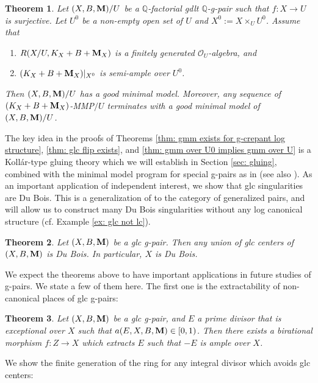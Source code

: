 \documentclass[11pt]{amsart}
\numberwithin{equation}{section}
\newcommand{\Mm}{{\bf{M}}}
\newcommand{\Qq}{\mathbb{Q}}
\newcommand{\Oo}{\mathcal{O}}
\newtheorem{thm}{Theorem}[section]
\theoremstyle{definition}
\theoremstyle{definition}
\theoremstyle{definition}
\begin{document}
\begin{thm}\label{thm: finite generation imply semi-ample}
  Let $(X,B,\Mm)/U$ be a $\Qq$-factorial gdlt $\Qq$-g-pair such that
  $f: X\to U$ is surjective. Let $U^0$ be a non-empty open set of $U$
  and $X^0:=X\times_U U^0$. Assume that
  \begin{enumerate}
    \item $R(X/U,K_X+B+\Mm_X)$ is a finitely
      generated $\Oo_U$-algebra, and
    \item $(K_X+B+\Mm_X)|_{X^0}$ is semi-ample over $U^0$.
  \end{enumerate}
  Then $(X,B,\Mm)/U$ has a good minimal model. Moreover, any sequence
  of $(K_X+B+\Mm_X)$-MMP$/U$ terminates with a good minimal model of
  $(X,B,\Mm)/U$.
\end{thm}

The key idea in the proofs of Theorems \ref{thm: gmm exists for
g-crepant log structure}, \ref{thm: glc flip exists}, and \ref{thm:
gmm over U0 implies gmm over U} is a Koll\'ar-type gluing theory
which we will establish in Section \ref{sec: gluing}, combined with
the minimal model program for special g-pairs as in \cite{LX22} (see
also \cite{Has22}). As an important application of independent
interest, we show that glc singularities are Du Bois. This is a
generalization of \cite[Theorem 1.4]{KK10} to the category of
generalized pairs, and will allow us to construct many Du Bois
singularities without any log canonical structure (cf. Example
\ref{ex: glc not lc}).

\begin{thm}\label{thm: glc sings are Du Bois}
  Let $(X,B,\Mm)$ be a glc g-pair. Then any union of glc centers of
  $(X,B,\Mm)$ is Du Bois. In particular, $X$ is Du Bois.
\end{thm}

We expect the theorems above to have important applications in future
studies of g-pairs. We state a few of them here. The first one is the
extractability of non-canonical places of glc g-pairs:

\begin{thm}\label{thm: extracting divisor over glc structure}
  Let $(X,B,\Mm)$ be a glc g-pair, and $E$ a prime divisor that is
  exceptional over $X$ such that $a(E,X,B,\Mm)\in [0,1)$. Then there
  exists a birational morphism $f: Z\to X$ which extracts $E$ such
  that $-E$ is ample over $X$.
\end{thm}

We show the finite generation of the ring for any integral divisor
which avoids glc centers:
\end{document}
